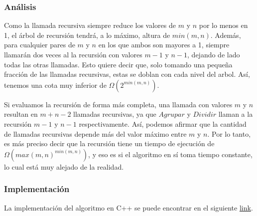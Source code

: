 \subsubsection*{Análisis}
Como la llamada recursiva siempre reduce los valores de $m$ y $n$ por lo menos en 1, el árbol de recursión tendrá, a lo máximo, altura de $min(m,n)$. Además, para cualquier pares de $m$ y $n$ en los que ambos son mayores a 1, siempre llamarán dos veces al la recursión con valores $m-1$ y $n-1$, dejando de lado todas las otras llamadas. Esto quiere decir que, solo tomando una pequeña fracción de las llamadas recursivas, estas se doblan con cada nivel del arbol. Así, tenemos una cota muy inferior de $\Omega(2^{min(m,n)})$. 

Si evaluamos la recursión de forma más completa, una llamada con valores $m$ y $n$ resultan en $m+n-2$ llamadas recursivas, ya que $Agrupar$ y $Dividir$ llaman a la recursión $m-1$ y $n-1$ respectivamente. Así, podemos afirmar que la cantidad de llamadas recursivas depende más del valor máximo entre $m$ y $n$. Por lo tanto, es más preciso decir que la recursión tiene un tiempo de ejecución de $\Omega(max(m,n)^{min(m,n)})$, y eso es si el algoritmo en sí toma tiempo constante, lo cual está muy alejado de la realidad.

\subsubsection*{Implementación}
La implementación del algoritmo en C++ se puede encontrar en el siguiente \href{https://github.com/Guillermo598/ProyectoADA/blob/master/Pregunta3.cpp}{link}.
